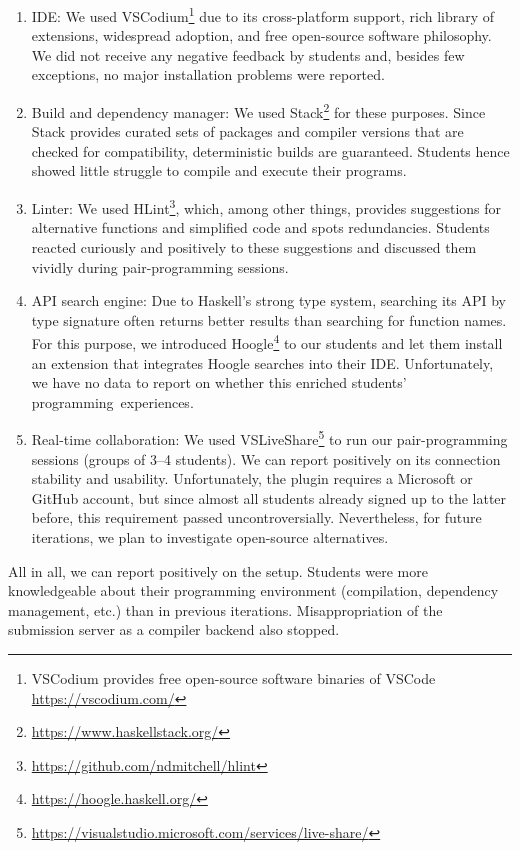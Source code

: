 \begin{enumerate}
  \item IDE: We used VSCodium\footnote{VSCodium provides free open-source software binaries of VSCode \url{https://vscodium.com/}} due to its cross-platform support,
    rich library of extensions,
    widespread adoption,
    and free open-source software philosophy.
    We did not receive any negative feedback by students
    and, besides few exceptions, no major installation problems were reported.
  \item Build and dependency manager: We used Stack\footnote{\url{https://www.haskellstack.org/}} for these purposes.
    Since Stack provides curated sets of packages and compiler versions that are checked for compatibility,
    deterministic builds are guaranteed.
    Students hence showed little struggle to compile and execute their programs.
  \item Linter: We used HLint\footnote{\url{https://github.com/ndmitchell/hlint}}, which, among other things,
    provides suggestions for alternative functions
    and simplified code and spots redundancies.
    Students reacted curiously and positively to these suggestions
    and discussed them vividly during pair-programming sessions.
  \item API search engine: Due to Haskell's strong type system,
    searching its API by type signature often returns better results than searching for function names.
    For this purpose, we introduced Hoogle\footnote{\url{https://hoogle.haskell.org/}} to our students and let them install an extension that integrates Hoogle searches into their IDE.
    Unfortunately, we have no data to report on whether this enriched students' programming~experiences.
  \item Real-time collaboration: We used VSLiveShare\footnote{\url{https://visualstudio.microsoft.com/services/live-share/}} to run our pair-programming sessions (groups of 3--4 students).
    We can report positively on its connection stability and usability.
    Unfortunately, the plugin requires a Microsoft or GitHub account,
    but since almost all students
    already signed up to the latter before,
    this requirement passed uncontroversially.
    Nevertheless, for future iterations,
    we plan to investigate open-source alternatives.
\end{enumerate}

All in all, we can report positively on the setup.
Students were more knowledgeable
about their programming environment (compilation, dependency management, etc.) than in previous iterations.
Misappropriation of the submission server as a compiler backend also stopped.
